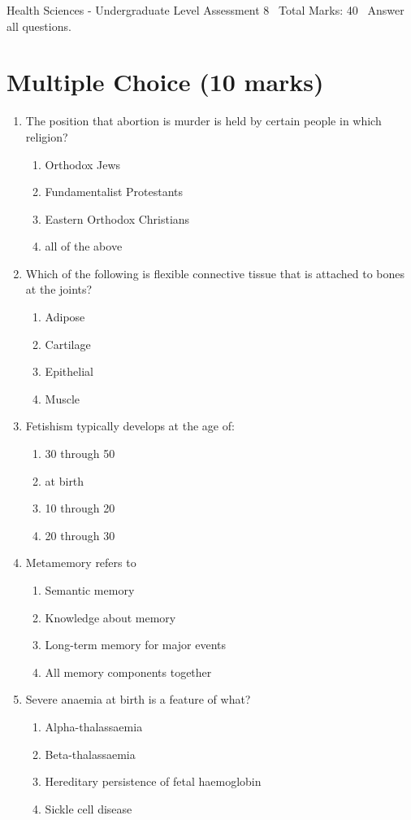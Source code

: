 \documentclass[12pt]{article}
\begin{document}
\begin{center}
Health Sciences - Undergraduate Level Assessment 8 \
Total Marks: 40 \
Answer all questions.
\end{center}

\section*{Multiple Choice (10 marks)}
\begin{enumerate}[label=\arabic*.]
\item The position that abortion is murder is held by certain people in which religion?
\begin{enumerate}[label=(\alph*)]
    \item Orthodox Jews
    \item Fundamentalist Protestants
    \item Eastern Orthodox Christians
    \item all of the above
\end{enumerate}
\item Which of the following is flexible connective tissue that is attached to bones at the joints?
\begin{enumerate}[label=(\alph*)]
    \item Adipose
    \item Cartilage
    \item Epithelial
    \item Muscle
\end{enumerate}
\item Fetishism typically develops at the age of:
\begin{enumerate}[label=(\alph*)]
    \item 30 through 50
    \item at birth
    \item 10 through 20
    \item 20 through 30
\end{enumerate}
\item Metamemory refers to
\begin{enumerate}[label=(\alph*)]
    \item Semantic memory
    \item Knowledge about memory
    \item Long-term memory for major events
    \item All memory components together
\end{enumerate}
\item Severe anaemia at birth is a feature of what?
\begin{enumerate}[label=(\alph*)]
    \item Alpha-thalassaemia
    \item Beta-thalassaemia
    \item Hereditary persistence of fetal haemoglobin
    \item Sickle cell disease
\end{enumerate}
\end{enumerate}
\end{document}
